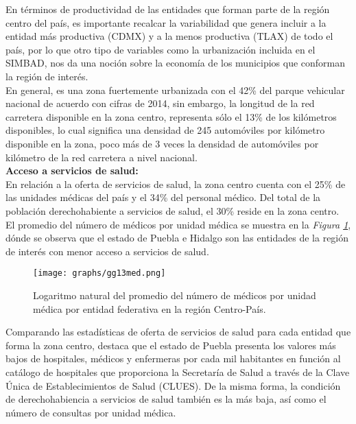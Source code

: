 \documentclass[11pt, oneside]{book}
\begin{document}
En términos de productividad de las entidades que forman parte de la región centro del país, es importante recalcar la variabilidad que genera incluir a la entidad más productiva (CDMX) y a la menos productiva (TLAX) de todo el país, por lo que otro tipo de variables como la urbanización incluida en el SIMBAD, nos da una noción sobre la economía de los municipios que conforman la región de interés.\\

En general, es una zona fuertemente urbanizada con el 42\% del parque vehicular nacional de acuerdo con cifras de 2014, sin embargo, la longitud de la red carretera disponible en la zona centro, representa sólo el 13\% de los kilómetros disponibles, lo cual significa una densidad de 245 automóviles por kilómetro disponible en la zona, poco más de 3 veces la densidad de automóviles por kilómetro de la red carretera a nivel nacional.\\

\noindent \textbf{Acceso a servicios de salud:}\\
\noindent En relación a la oferta de servicios de salud, la zona centro cuenta con el 25\% de las unidades médicas del país y el 34\% del personal médico. Del total de la población derechohabiente a servicios de salud, el 30\% reside en la zona centro. El promedio del número de médicos por unidad médica se muestra en la \emph{Figura \ref{fig.13.med}}, dónde se observa que el estado de Puebla e Hidalgo son las entidades de la región de interés con menor acceso a servicios de salud.\\

\begin{figure}[ht]
    \centering    
    \texttt{[image: graphs/gg13med.png]}
  \caption{Logaritmo natural del promedio del número de médicos por unidad médica por entidad federativa en la región Centro-País.}
  \label{fig.13.med}
\end{figure}


Comparando las estadísticas de oferta de servicios de salud para cada entidad que forma la zona centro, destaca que el estado de Puebla presenta los valores más bajos de hospitales, médicos y enfermeras por cada mil habitantes en función al catálogo de hospitales que proporciona la Secretaría de Salud a través de la Clave Única de Establecimientos de Salud (CLUES). De la misma forma, la condición de derechohabiencia a servicios de salud también es la más baja, así como el número de consultas por unidad médica.\\
\end{document}
